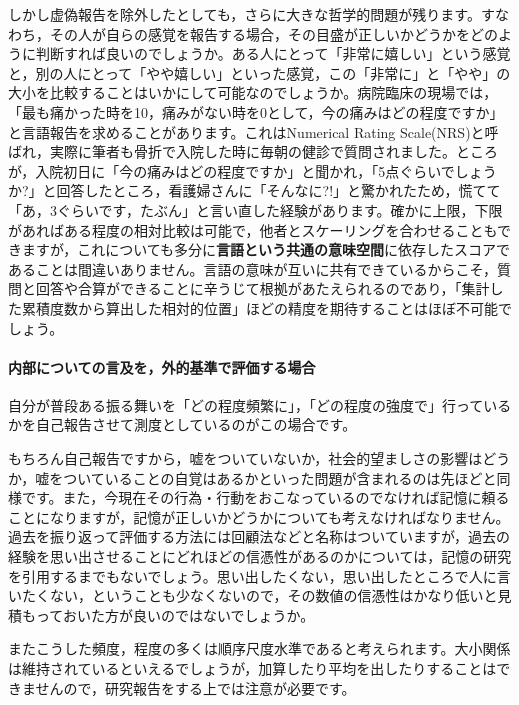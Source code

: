 \documentclass{ltjsbook}
\begin{document}
しかし虚偽報告を除外したとしても，さらに大きな哲学的問題が残ります。すなわち，その人が自らの感覚を報告する場合，その目盛が正しいかどうかをどのように判断すれば良いのでしょうか。ある人にとって「非常に嬉しい」という感覚と，別の人にとって「やや嬉しい」といった感覚，この「非常に」と「やや」の大小を比較することはいかにして可能なのでしょうか。病院臨床の現場では，「最も痛かった時を10，痛みがない時を0として，今の痛みはどの程度ですか」と言語報告を求めることがあります。これはNumerical Rating Scale(NRS)と呼ばれ，実際に筆者も骨折で入院した時に毎朝の健診で質問されました。ところが，入院初日に「今の痛みはどの程度ですか」と聞かれ，「5点ぐらいでしょうか?」と回答したところ，看護婦さんに「そんなに?!」と驚かれたため，慌てて「あ，3ぐらいです，たぶん」と言い直した経験があります。確かに上限，下限があればある程度の相対比較は可能で，他者とスケーリングを合わせることもできますが，これについても多分に\textbf{言語という共通の意味空間}に依存したスコアであることは間違いありません。言語の意味が互いに共有できているからこそ，質問と回答や合算ができることに辛うじて根拠があたえられるのであり，「集計した累積度数から算出した相対的位置」ほどの精度を期待することはほぼ不可能でしょう。
\paragraph{内部についての言及を，外的基準で評価する場合}
自分が普段ある振る舞いを「どの程度頻繁に」，「どの程度の強度で」行っているかを自己報告させて測度としているのがこの場合です。

もちろん自己報告ですから，嘘をついていないか，社会的望ましさの影響はどうか，嘘をついていることの自覚はあるかといった問題が含まれるのは先ほどと同様です。また，今現在その行為・行動をおこなっているのでなければ記憶に頼ることになりますが，記憶が正しいかどうかについても考えなければなりません。過去を振り返って評価する方法には回顧法などと名称はついていますが，過去の経験を思い出させることにどれほどの信憑性があるのかについては，記憶の研究を引用するまでもないでしょう。思い出したくない，思い出したところで人に言いたくない，ということも少なくないので，その数値の信憑性はかなり低いと見積もっておいた方が良いのではないでしょうか。

またこうした頻度，程度の多くは順序尺度水準であると考えられます。大小関係は維持されているといえるでしょうが，加算したり平均を出したりすることはできませんので，研究報告をする上では注意が必要です。
\end{document}
